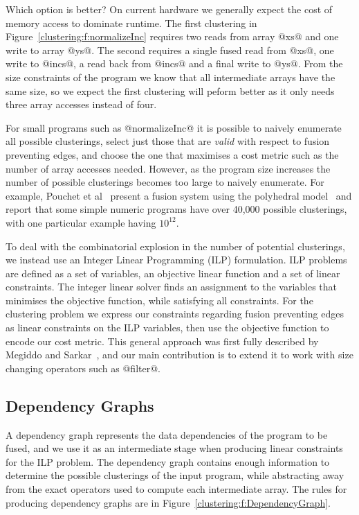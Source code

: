Which option is better? On current hardware we generally expect the cost of memory access to dominate runtime. The first clustering in Figure~\ref{clustering:f:normalizeInc} requires two reads from array @xs@ and one write to array @ys@. The second requires a single fused read from @xs@, one write to @incs@, a read back from @incs@ and a final write to @ys@. From the size constraints of the program we know that all intermediate arrays have the same size, so we expect the first clustering will peform better as it only needs three array accesses instead of four. 

For small programs such as @normalizeInc@ it is possible to naively enumerate all possible clusterings, select just those that are \emph{valid} with respect to fusion preventing edges, and choose the one that maximises a cost metric such as the number of array accesses needed. However, as the program size increases the number of possible clusterings becomes too large to naively enumerate. For example, Pouchet et al~\cite{pouchet2010combined} present a fusion system using the polyhedral model~\cite{pouchet2011polyhedral} and report that some simple numeric programs have over 40,000 possible clusterings, with one particular example having $10^{12}$. 

To deal with the combinatorial explosion in the number of potential clusterings, we instead use an Integer Linear Programming (ILP) formulation. ILP problems are defined as a set of variables, an objective linear function and a set of linear constraints. The integer linear solver finds an assignment to the variables that minimises the objective function, while satisfying all constraints. For the clustering problem we express our constraints regarding fusion preventing edges as linear constraints on the ILP variables, then use the objective function to encode our cost metric. This general approach was first fully described by Megiddo and Sarkar~\cite{megiddo1998optimal}, and our main contribution is to extend it to work with size changing operators such as @filter@. 


\subsection{Dependency Graphs}
A dependency graph represents the data dependencies of the program to be fused, and we use it as an intermediate stage when producing linear constraints for the ILP problem. The dependency graph contains enough information to determine the possible clusterings of the input program, while abstracting away from the exact operators used to compute each intermediate array. The rules for producing dependency graphs are in Figure~\ref{clustering:f:DependencyGraph}.

